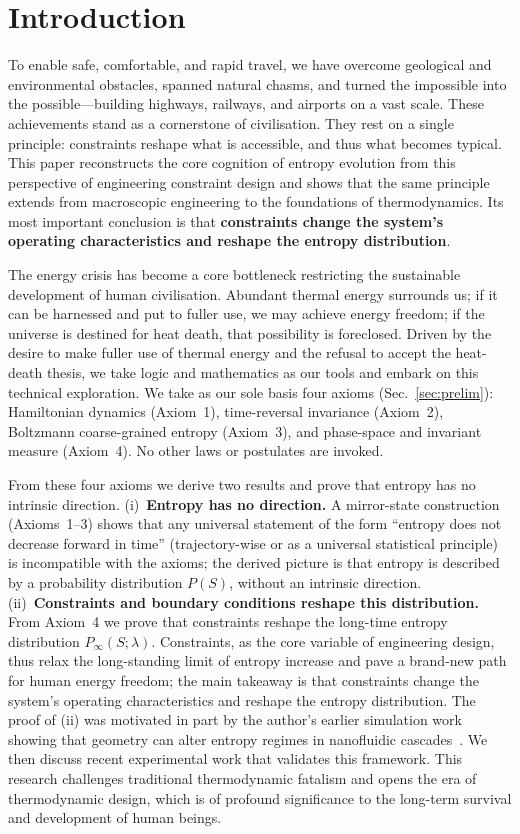\documentclass[11pt,a4paper]{article}
\begin{document}
\section{Introduction}

To enable safe, comfortable, and rapid travel, we have overcome geological and
environmental obstacles, spanned natural chasms, and turned the impossible into
the possible---building highways, railways, and airports on a vast scale. These
achievements stand as a cornerstone of civilisation. They rest on a single
principle: constraints reshape what is accessible, and thus what becomes
typical. This paper reconstructs the core cognition of entropy evolution from
this perspective of engineering constraint design and shows that the same
principle extends from macroscopic engineering to the foundations of
thermodynamics. Its most important conclusion is that \textbf{constraints
change the system's operating characteristics and reshape the entropy
distribution}.

The energy crisis has become a core bottleneck restricting the sustainable
development of human civilisation. Abundant thermal energy surrounds us; if it
can be harnessed and put to fuller use, we may achieve energy freedom; if the
universe is destined for heat death, that possibility is foreclosed. Driven by
the desire to make fuller use of thermal energy and the refusal to accept the
heat-death thesis, we take
logic and mathematics as our tools and embark on this technical exploration. We
take as our sole basis four axioms (Sec.~\ref{sec:prelim}): Hamiltonian
dynamics (Axiom~1), time-reversal invariance (Axiom~2), Boltzmann coarse-grained
entropy (Axiom~3), and phase-space and invariant measure (Axiom~4). No other laws
or postulates are invoked.

From these four axioms we derive two results and prove that entropy has no
intrinsic direction. (i)~\textbf{Entropy has no direction.} A
mirror-state construction (Axioms~1--3) shows that any universal statement of the
form ``entropy does not decrease forward in time'' (trajectory-wise or as a
universal statistical principle) is incompatible with the axioms; the derived picture is that entropy is described by a
probability distribution $P(S)$, without an intrinsic direction. (ii)~\textbf{Constraints
and boundary conditions reshape this distribution.} From Axiom~4 we prove that
constraints reshape the long-time entropy distribution
$P_{\infty}(S;\lambda)$. Constraints, as the core variable of engineering
design, thus relax the long-standing limit of entropy increase and pave a
brand-new path for human energy freedom; the main takeaway is that constraints change the
system's operating characteristics and reshape the entropy distribution. The
proof of (ii) was motivated in part by the author's earlier simulation work showing that geometry can alter entropy regimes in
nanofluidic cascades~\cite{peng2026geometrychallengesentropyregimedependentrectification}.
We then discuss recent experimental work that validates this framework. This research challenges traditional thermodynamic fatalism and opens the era of
thermodynamic design, which is of profound significance to the long-term
survival and development of human beings.
\end{document}

